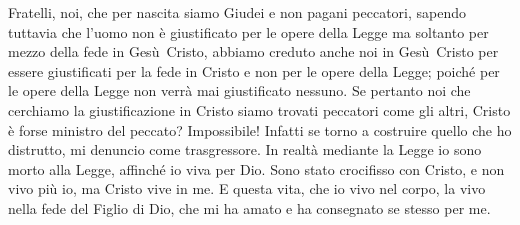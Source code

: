 Fratelli, noi, che per nascita siamo Giudei e non pagani peccatori, sapendo tuttavia che l'uomo non è giustificato per le opere della Legge ma soltanto per mezzo della fede in Gesù~Cristo, abbiamo creduto anche noi in Gesù~Cristo per essere giustificati per la fede in Cristo e non per le opere della Legge; poiché per le opere della Legge non verrà mai giustificato nessuno. Se pertanto noi che cerchiamo la giustificazione in Cristo siamo trovati peccatori come gli altri, Cristo è forse ministro del peccato? Impossibile! Infatti se torno a costruire quello che ho distrutto, mi denuncio come trasgressore. In realtà mediante la Legge io sono morto alla Legge, affinché io viva per Dio. Sono stato crocifisso con Cristo, e non vivo più io, ma Cristo vive in me. E questa vita, che io vivo nel corpo, la vivo nella fede del Figlio di Dio, che mi ha amato e ha consegnato se stesso per me.